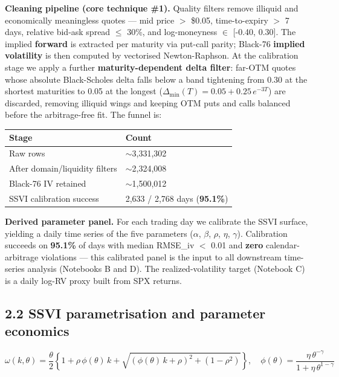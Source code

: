 \documentclass[10pt,a4paper]{article}
\begin{document}
\textbf{Cleaning pipeline (core technique \#1).} Quality filters remove illiquid and economically meaningless quotes --- mid price $>$ \$0.05, time-to-expiry $>$ 7 days, relative bid-ask spread $\le$ 30\%, and log-moneyness $\in$ [-0.40, 0.30]. The implied \textbf{forward} is extracted per maturity via put-call parity; Black-76 \textbf{implied volatility} is then computed by vectorised Newton-Raphson. At the calibration stage we apply a further \textbf{maturity-dependent delta filter}: far-OTM quotes whose absolute Black-Scholes delta falls below a band tightening from 0.30 at the shortest maturities to 0.05 at the longest ($\Delta_{\min}(T) = 0.05 + 0.25\,e^{-3T}$) are discarded, removing illiquid wings and keeping OTM puts and calls balanced before the arbitrage-free fit. The funnel is:

\begin{center}\small
\begin{tabular}{ll}
\toprule
\textbf{Stage} & \textbf{Count} \\
\midrule
Raw rows & $\sim$3,331,302 \\
After domain/liquidity filters & $\sim$2,324,008 \\
Black-76 IV retained & $\sim$1,500,012 \\
SSVI calibration success & 2,633 / 2,768 days (\textbf{95.1\%}) \\
\bottomrule
\end{tabular}
\end{center}

\textbf{Derived parameter panel.} For each trading day we calibrate the SSVI surface, yielding a daily time series of the five parameters ($\alpha$, $\beta$, $\rho$, $\eta$, $\gamma$). Calibration succeeds on \textbf{95.1\%} of days with median RMSE\_iv $<$ 0.01 and \textbf{zero} calendar-arbitrage violations --- this calibrated panel is the input to all downstream time-series analysis (Notebooks B and D). The realized-volatility target (Notebook C) is a daily log-RV proxy built from SPX returns.

\subsection*{2.2 SSVI parametrisation and parameter economics}

$$\omega(k,\theta) = \frac{\theta}{2}\left\{1 + \rho\,\phi(\theta)\,k + \sqrt{(\phi(\theta)\,k+\rho)^2 + (1-\rho^2)}\right\}, \quad \phi(\theta) = \frac{\eta\,\theta^{-\gamma}}{1+\eta\,\theta^{1-\gamma}}$$
\end{document}
